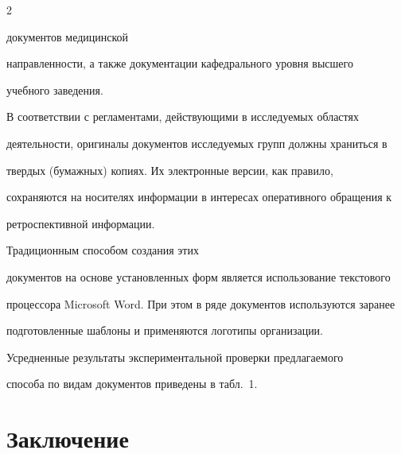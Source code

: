 \begin{multicols}{2}





\noindent


 документов медицинской 


направленности, а также документации кафедрального уровня высшего 


учебного заведения.


     


     В соответствии с регламентами, действующими в исследуемых областях 


деятельности, оригиналы документов исследуемых групп должны храниться в 


твердых (бумажных) копиях. Их электронные версии, как правило, 


сохраняются на носителях информации в интересах оперативного обращения к 


ретроспективной информации. 





Традиционным способом создания этих 


документов на основе установленных форм является использование текстового 


процессора Microsoft Word. При этом в ряде документов используются заранее 


подготовленные шаблоны и применяются логотипы организации.


{ %





}


     


     Усредненные результаты экспериментальной проверки предлагаемого 


способа по видам документов приведены в табл.~1.





     


\section{Заключение}


\vspace*{-4pt}





     



\end{multicols}
